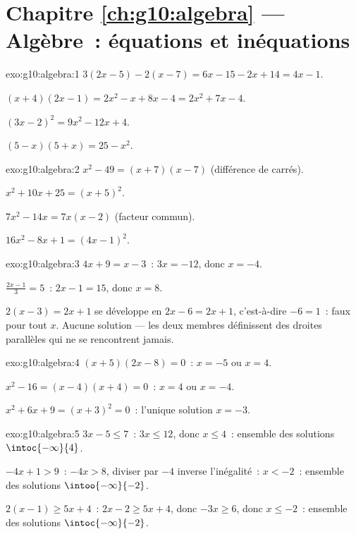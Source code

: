\section*{Chapitre \ref{ch:g10:algebra} --- Algèbre~: équations et inéquations}

\begin{solution}{exo:g10:algebra:1}
$3(2x-5) - 2(x-7) = 6x - 15 - 2x + 14 = 4x - 1$.

$(x+4)(2x-1) = 2x^2 - x + 8x - 4 = 2x^2 + 7x - 4$.

$(3x-2)^2 = 9x^2 - 12x + 4$.

$(5-x)(5+x) = 25 - x^2$.
\end{solution}

\begin{solution}{exo:g10:algebra:2}
$x^2 - 49 = (x+7)(x-7)$ (différence de carrés).

$x^2 + 10x + 25 = (x+5)^2$.

$7x^2 - 14x = 7x(x - 2)$ (facteur commun).

$16x^2 - 8x + 1 = (4x - 1)^2$.
\end{solution}

\begin{solution}{exo:g10:algebra:3}
$4x + 9 = x - 3$~: $3x = -12$, donc $x = -4$.

$\frac{2x-1}{3} = 5$~: $2x - 1 = 15$, donc $x = 8$.

$2(x-3) = 2x + 1$ se développe en $2x - 6 = 2x + 1$, c'est-à-dire
$-6 = 1$~: faux pour tout $x$. Aucune solution --- les deux membres
définissent des droites parallèles qui ne se rencontrent jamais.
\end{solution}

\begin{solution}{exo:g10:algebra:4}
$(x+5)(2x-8) = 0$~: $x = -5$ ou $x = 4$.

$x^2 - 16 = (x-4)(x+4) = 0$~: $x = 4$ ou $x = -4$.

$x^2 + 6x + 9 = (x+3)^2 = 0$~: l'unique solution $x = -3$.
\end{solution}

\begin{solution}{exo:g10:algebra:5}
$3x - 5 \leq 7$~: $3x \leq 12$, donc $x \leq 4$~: ensemble des solutions
$\intoc{-\infty}{4}$.

$-4x + 1 > 9$~: $-4x > 8$, diviser par $-4$ inverse l'inégalité~:
$x < -2$~: ensemble des solutions $\intoo{-\infty}{-2}$.

$2(x-1) \geq 5x + 4$~: $2x - 2 \geq 5x + 4$, donc $-3x \geq 6$, donc
$x \leq -2$~: ensemble des solutions $\intoc{-\infty}{-2}$.
\end{solution}


